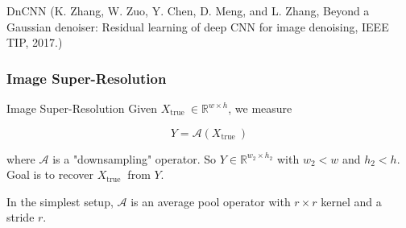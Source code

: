 \begin{frame}[allowframebreaks]
\begin{mydefinitionblock}{8.4}{DnCNN}
    (K. Zhang, W. Zuo, Y. Chen, D. Meng, and L. Zhang, Beyond a Gaussian denoiser: Residual learning of deep CNN for image denoising, IEEE TIP, 2017.)
\end{mydefinitionblock}

\end{frame}

\subsubsection{Image Super-Resolution}

\begin{frame}[allowframebreaks]

\begin{mydefinitionblock}{8.5}{Image Super-Resolution}
    Given $X_{\text {true }} \in \mathbb{R}^{w \times h}$, we measure

    $$
    Y=\mathcal{A}\left(X_{\text {true }}\right)
    $$

    where $\mathcal{A}$ is a "downsampling" operator. So $Y \in \mathbb{R}^{w_{2} \times h_{2}}$ with $w_{2}<w$ and $h_{2}<h$. Goal is to recover $X_{\text {true }}$ from $Y$.

    In the simplest setup, $\mathcal{A}$ is an average pool operator with $r \times r$ kernel and a stride $r$.
\end{mydefinitionblock}

\end{frame}

